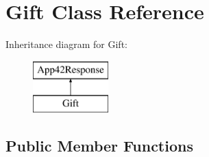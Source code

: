 \hypertarget{class_gift}{\section{Gift Class Reference}
\label{class_gift}
}
Inheritance diagram for Gift\+:\begin{figure}[H]
\begin{center}
\leavevmode
\includegraphics[height=2.000000cm]{class_gift}
\end{center}
\end{figure}
\subsection*{Public Member Functions}
